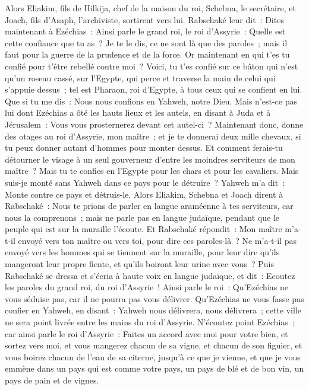 \begin{multicols}{2}
Alors Eliakim, fils de Hilkija, chef de la maison du roi, Schebna, le secrétaire, et Joach, fils d'Asaph, l'archiviste, sortirent vers lui.
Rabschaké leur dit~: Dites maintenant à Ezéchias~: Ainsi parle le grand roi, le roi d'Assyrie~: Quelle est cette confiance que tu as~?
Je te le dis, ce ne sont là que des paroles~; mais il faut pour la guerre de la prudence et de la force. Or maintenant en qui t'es tu confié pour t'être rebellé contre moi~?
Voici, tu t'es confié sur ce bâton qui n'est qu'un roseau cassé, sur l'Egypte, qui perce et traverse la main de celui qui s'appuie dessus~; tel est Pharaon, roi d'Egypte, à tous ceux qui se confient en lui.
Que si tu me dis~: Nous nous confions en Yahweh, notre Dieu. Mais n'est-ce pas lui dont Ezéchias a ôté les hauts lieux et les autels, en disant à Juda et à Jérusalem~: Vous vous prosternerez devant cet autel-ci~?
Maintenant donc, donne des otages au roi d'Assyrie, mon maître~; et je te donnerai deux mille chevaux, si tu peux donner autant d'hommes pour monter dessus.
Et comment ferais-tu détourner le visage à un seul gouverneur d'entre les moindres serviteurs de mon maître~? Mais tu te confies en l'Egypte pour les chars et pour les cavaliers.
Mais suis-je monté sans Yahweh dans ce pays pour le détruire~? Yahweh m'a dit~: Monte contre ce pays et détruis-le.
Alors Eliakim, Schebna et Joach dirent à Rabschaké~: Nous te prions de parler en langue araméenne à tes serviteurs, car nous la comprenons~; mais ne parle pas en langue judaïque, pendant que le peuple qui est sur la muraille l'écoute.
Et Rabschaké répondit~: Mon maître m'a-t-il envoyé vers ton maître ou vers toi, pour dire ces paroles-là~? Ne m'a-t-il pas envoyé vers les hommes qui se tiennent sur la muraille, pour leur dire qu'ils mangeront leur propre fiente, et qu'ils boiront leur urine avec vous~?
Puis Rabschaké se dressa et s'écria à haute voix en langue judaïque, et dit~: Ecoutez les paroles du grand roi, du roi d'Assyrie~!
Ainsi parle le roi~: Qu'Ezéchias ne vous séduise pas, car il ne pourra pas vous délivrer.
Qu'Ezéchias ne vous fasse pas confier en Yahweh, en disant~: Yahweh nous délivrera, nous délivrera~; cette ville ne sera point livrée entre les mains du roi d'Assyrie.
N'écoutez point Ezéchias~; car ainsi parle le roi d'Assyrie~: Faites un accord avec moi pour votre bien, et sortez vers moi, et vous mangerez chacun de sa vigne, et chacun de son figuier, et vous boirez chacun de l'eau de sa citerne,
jusqu'à ce que je vienne, et que je vous emmène dans un pays qui est comme votre pays, un pays de blé et de bon vin, un pays de pain et de vignes.

\end{multicols}
